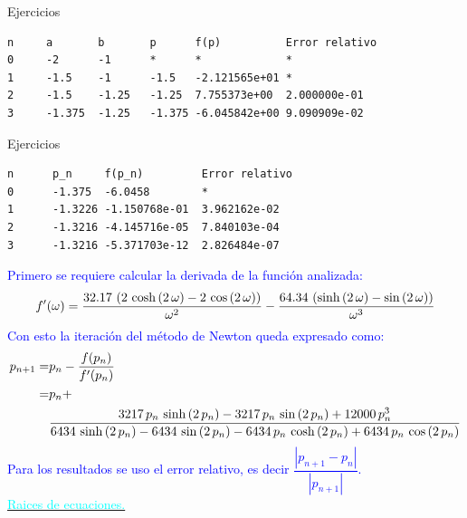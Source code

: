 \begin{frame}[fragile]{Ejercicios}
\begin{itemize}
\end{itemize}
\pause
\small
\begin{lstlisting}[style=mystyle,backgroundcolor=\color{gray!30}]
n     a       b       p      f(p)          Error relativo
0     -2      -1      *      *             *
1     -1.5    -1      -1.5   -2.121565e+01 *
2     -1.5    -1.25   -1.25  7.755373e+00  2.000000e-01
3     -1.375  -1.25   -1.375 -6.045842e+00 9.090909e-02
\end{lstlisting}
\normalsize
\begin{itemize}
\end{itemize}
\end{frame}
\begin{frame}[fragile]{Ejercicios}
\small
\begin{lstlisting}[style=mystyle,backgroundcolor=\color{gray!30}]
n      p_n     f(p_n)         Error relativo
0      -1.375  -6.0458        *
1      -1.3226 -1.150768e-01  3.962162e-02
2      -1.3216 -4.145716e-05  7.840103e-04
3      -1.3216 -5.371703e-12  2.826484e-07
\end{lstlisting}
\normalsize
\textcolor{blue}{Primero se requiere calcular la derivada de la función analizada:
$$f'(\omega)={{32.17\,\left(2\,\cosh \left(2\,\omega\right)-2\,\cos \left(2\,\omega\right)
 \right)}\over{\omega^2}}-{{64.34\,\left(\sinh \left(2\,\omega\right)-\sin
 \left(2\,\omega\right)\right)}\over{\omega^3}}$$
 Con esto la iteración del método de Newton queda expresado como:
 \small
 \begin{align*}
 p_{n+1}=&p_{n}-\dfrac{f(p_n)}{f'(p_n)}\\
 =&p_n+\\
 &{{3217\,p_{n}\,\sinh \left(2\,p_{n}\right)-3217\,p_{n}\,\sin
 \left(2\,p_{n}\right)+12000\,p_{n}^3}\over{6434\,\sinh \left(2\,p_{n
 }\right)-6434\,\sin \left(2\,p_{n}\right)-6434\,p_{n}\,\cosh \left(2
 \,p_{n}\right)+6434\,p_{n}\,\cos \left(2\,p_{n}\right)}}
 \end{align*}
 \normalsize
 Para los resultados se uso el error relativo, es decir $\dfrac{|p_{n+1}-p_{n}|}{|p_{n+1}|}$.\\
}
\hyperlink{RetornoTeoremaRaices4}{\textcolor{cyan}{Raices de ecuaciones.}} 
\end{frame}
